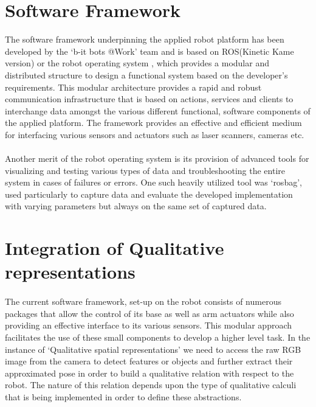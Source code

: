 \section{Software Framework}
The software framework underpinning the applied robot platform has been developed by the `b-it bots @Work' team and is based on ROS(Kinetic Kame version) or the robot operating system \cite{quigley2009ros}, which provides a modular and distributed structure to design a functional system based on the developer's requirements. This modular architecture provides a rapid and robust communication infrastructure that is based on actions, services and clients to interchange data amongst the various different functional, software components of the applied platform. The framework provides an effective and efficient medium for interfacing various sensors and actuators such as laser scanners, cameras etc. 

\paragraph{}Another merit of the robot operating system is its provision of advanced tools for visualizing and testing various types of data and troubleshooting the entire system in cases of failures or errors. One such heavily utilized tool was `rosbag', used particularly to capture data \cite{Hegger2012} and evaluate the developed implementation with varying parameters but always on the same set of captured data.

\section{Integration of Qualitative representations}
\paragraph{}The current software framework, set-up on the robot consists of numerous packages that allow the control of its base as well as arm actuators while also providing an effective interface to its various sensors. This modular approach facilitates the use of these small components to develop a higher level task. In the instance of `Qualitative spatial representations' we need to access the raw RGB image from the camera to detect features or objects and further extract their approximated pose in order to build a qualitative relation with respect to the robot. The nature of this relation depends upon the type of qualitative calculi that is being implemented in order to define these abstractions.

